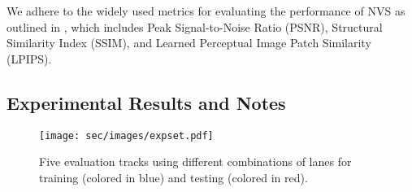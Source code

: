 We adhere to the widely used metrics for evaluating the performance of NVS as outlined in \cite{li2024xld}, which includes Peak Signal-to-Noise Ratio (PSNR), Structural Similarity Index (SSIM), and Learned Perceptual Image Patch Similarity (LPIPS).

\subsection{Experimental Results and Notes}
\label{sec:bench:main}

\begin{figure}[t]
\texttt{[image: sec/images/expset.pdf]}
\caption{{Five evaluation tracks using different combinations of lanes for training (colored in blue) and testing (colored in red).}}
\label{fig:expset}
\end{figure}

